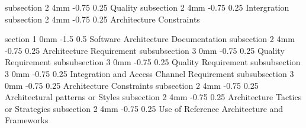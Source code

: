 \documentclass[12pt]{article}
\makeatletter
\renewcommand{\section}{\@startsection
   {section}%
   {1}%
   {0mm}%
   {-1.5\baselineskip}%
   {0.5\baselineskip}%
   {\sffamily\bfseries\upshape\normalsize}}%
\renewcommand{\subsection}{\@startsection
   {subsection}%
   {2}%
   {4mm}%
   {-0.75\baselineskip}%
   {0.25\baselineskip}%
   {\rmfamily\normalfont\scshape\normalsize}}%
\renewcommand{\subsubsection}{\@startsection
   {subsubsection}%
   {3}%
   {0mm}%
   {-0.75\baselineskip}%
   {0.25\baselineskip}%
   {\rmfamily\normalfont\slshape\normalsize}}%
\makeatother
\begin{document}
                		\subsection{Quality}
                		\subsection{Intergration}
                		\subsection{Architecture Constraints}
               
                \section{Software Architecture Documentation}
               		 \subsection{Architecture Requirement}
                			\subsubsection{Quality Requirement}  
                			\subsubsection{Quality Requirement}  
                			\subsubsection{Integration and Access Channel Requirement}  
                			\subsubsection{Architecture Constraints}  
                	\subsection{Architectural patterns or Styles}
                    \subsection{Architecture Tactics or Strategies}
                    \subsection{Use of Reference Architecture and Frameworks }
\end{document}

